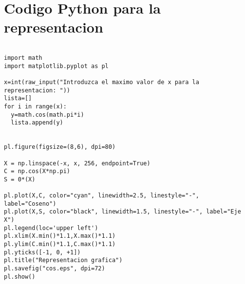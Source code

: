 \section{Codigo \textsf{Python} para la representacion}
\label{Apendice2:label}

\begin{center}
\begin{footnotesize}

\begin{verbatim}

import math
import matplotlib.pyplot as pl

x=int(raw_input("Introduzca el maximo valor de x para la representacion: "))
lista=[]
for i in range(x):
  y=math.cos(math.pi*i)
  lista.append(y)
  

pl.figure(figsize=(8,6), dpi=80)

X = np.linspace(-x, x, 256, endpoint=True)
C = np.cos(X*np.pi)
S = 0*(X)

pl.plot(X,C, color="cyan", linewidth=2.5, linestyle="-", label="Coseno")
pl.plot(X,S, color="black", linewidth=1.5, linestyle="-", label="Eje X")
pl.legend(loc='upper left')
pl.xlim(X.min()*1.1,X.max()*1.1)
pl.ylim(C.min()*1.1,C.max()*1.1)
pl.yticks([-1, 0, +1])
pl.title("Representacion grafica")
pl.savefig("cos.eps", dpi=72)
pl.show()
\end{verbatim}

\end{footnotesize}
\end{center}

